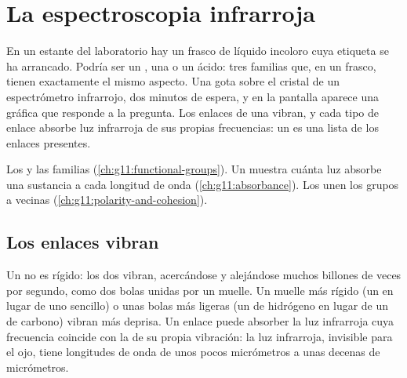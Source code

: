 \chapter{La espectroscopia infrarroja}\label{ch:g11:infrared}

En un estante del laboratorio hay un frasco de líquido incoloro cuya
etiqueta se ha arrancado. Podría ser un , una  o un ácido:
tres familias que, en un frasco, tienen exactamente el mismo aspecto.
Una gota sobre el cristal de un espectrómetro infrarrojo, dos minutos de
espera, y en la pantalla aparece una gráfica que responde a la pregunta.
Los enlaces de una  vibran, y cada tipo de enlace absorbe luz
infrarroja de sus propias frecuencias: un  es una
lista de los enlaces presentes.

\begin{recall}
Los  y las familias (\cref{ch:g11:functional-groups}).
Un  muestra cuánta luz absorbe una sustancia a cada
longitud de onda (\cref{ch:g11:absorbance}). Los 
unen los grupos  a  vecinas
(\cref{ch:g11:polarity-and-cohesion}).
\end{recall}

\section{Los enlaces vibran}

Un  no es rígido: los dos  vibran, acercándose y
alejándose muchos billones de veces por segundo, como dos bolas unidas
por un muelle. Un muelle más rígido (un  en lugar de uno
sencillo) o unas bolas más ligeras (un  de hidrógeno en lugar de un
 de carbono) vibran más deprisa. Un enlace puede absorber la luz
infrarroja cuya frecuencia coincide con la de su propia vibración: la
luz infrarroja, invisible para el ojo, tiene longitudes de onda de unos
pocos micrómetros a unas decenas de micrómetros.

